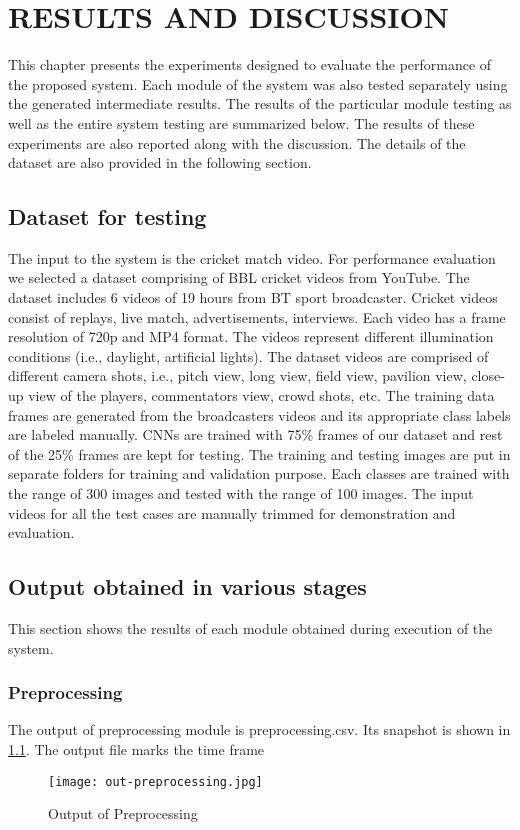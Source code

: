 
\chapter{RESULTS AND DISCUSSION} %
This chapter presents the experiments designed to evaluate the performance of the proposed system. Each module of the system was also tested separately using the generated intermediate results. The results of the particular module testing as well as the entire system testing are summarized below. The results of these experiments are also reported along with the discussion. The details of the dataset are also provided in the following section.

\section{Dataset for testing}
The input to the system is the cricket match video. For performance evaluation we selected a dataset comprising of BBL cricket videos from YouTube. The dataset includes 6 videos of 19 hours from BT sport broadcaster. Cricket videos consist of replays, live match, advertisements, interviews. Each video has a frame resolution of 720p and MP4 format. The videos represent different illumination conditions (i.e., daylight, artificial lights). The dataset videos are comprised of different camera shots, i.e., pitch view, long view, field view, pavilion view, close-up view of the players, commentators view, crowd shots, etc. The training data frames are generated from the broadcasters videos and its appropriate class labels are labeled manually. CNNs are trained with 75\% frames of our dataset and rest of the 25\% frames are kept for testing. The training and testing images are put in separate folders for training and validation purpose. Each classes are trained with the range of 300 images and tested with the range of 100 images. The input videos for all the test cases are manually trimmed for demonstration and evaluation.

\section{Output obtained in various stages}
This section shows the results of each module obtained during execution of the system.
\subsection{Preprocessing}
The output of preprocessing module is \textquotesingle preprocessing.csv\textquotesingle. Its snapshot is shown in \ref{fig:out-preprocessing}. The output file marks the time frame 
\begin{figure}[h]
    \centering
   \texttt{[image: out-preprocessing.jpg]}
    \caption{Output of Preprocessing}
    \label{fig:out-preprocessing}
\end{figure}
